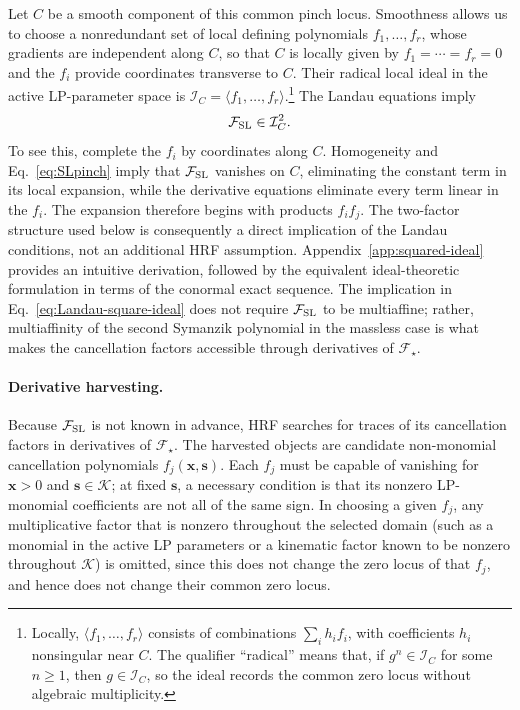 \documentclass[a4paper,11pt]{article}
\newcommand{\x}{\boldsymbol{x}}
\newcommand{\s}{\boldsymbol{s}}
\newcommand{\K}{\mathcal K}
\newcommand{\FSL}{\mathcal F_{\rm SL}}
\newcommand{\ideal}{\mathcal I}
\begin{document}
Let \(C\) be a smooth component of this common pinch locus.  Smoothness allows
us to choose a nonredundant set of local defining polynomials
\(f_1,\ldots,f_r\), whose gradients are independent along \(C\), so that
\(C\) is locally given by \(f_1=\cdots=f_r=0\) and the \(f_i\) provide
coordinates transverse to \(C\).  Their radical local ideal in the active
LP-parameter space is \(\ideal_C=\langle f_1,\ldots,f_r\rangle\).\footnote{Locally,
\(\langle f_1,\ldots,f_r\rangle\) consists of combinations
\(\sum_i h_i f_i\), with coefficients \(h_i\) nonsingular near \(C\).  The
qualifier ``radical'' means that, if \(g^n\in\ideal_C\) for some \(n\geq1\),
then \(g\in\ideal_C\), so the ideal records the common zero locus without
algebraic multiplicity.}  The Landau equations imply
\begin{equation}
 \FSL\in\ideal_C^2.
 \label{eq:Landau-square-ideal}
\end{equation}
To see this, complete the \(f_i\) by coordinates along \(C\).  Homogeneity and
Eq.~\eqref{eq:SLpinch} imply that \(\FSL\) vanishes
on \(C\), eliminating the constant term in its local expansion, while the
derivative equations eliminate every term linear in the \(f_i\).
The expansion therefore begins with products \(f_if_j\).  The two-factor
structure used below is consequently a direct implication of the Landau
conditions, not an additional HRF assumption.
Appendix~\ref{app:squared-ideal} provides an intuitive derivation, followed by
the equivalent ideal-theoretic formulation
in terms of the conormal exact sequence.  The implication in
Eq.~\eqref{eq:Landau-square-ideal} does not require \(\FSL\) to be
multiaffine; rather, multiaffinity of the second Symanzik polynomial in the
massless case is what makes the cancellation factors accessible through
derivatives of \(\mathcal F_\star\).

\paragraph{Derivative harvesting.}

Because \(\FSL\) is not known in advance, HRF searches for traces of its
cancellation factors in derivatives of \(\mathcal F_\star\).  The harvested
objects are candidate non-monomial cancellation polynomials
\(f_j(\x,\s)\).  Each \(f_j\) must be capable of vanishing for \(\x>0\) and
\(\s\in\K\); at fixed \(\s\), a necessary condition is that its nonzero
LP-monomial coefficients are not all of the same sign.  In choosing a given
\(f_j\), any multiplicative factor that is nonzero throughout the selected
domain (such as a monomial in the active LP parameters or a kinematic factor
known to be nonzero throughout \(\K\)) is omitted, since this does not change
the zero locus of that \(f_j\), and hence does not change their common zero
locus.
\end{document}
